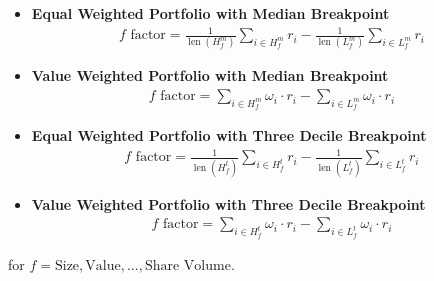 \begin{itemize}
	\item \textbf{Equal Weighted Portfolio with Median Breakpoint}
	\begin{align*}
		f \text{ factor} = \frac{1}{\operatorname{len}(H_{f}^{m})}\sum_{i \in H_{f}^{m}} r_i - \frac{1}{\operatorname{len}(L_{f}^{m})}\sum_{i \in L_{f}^{m}} r_i
	\end{align*}
	
	\item \textbf{Value Weighted Portfolio with Median Breakpoint}
	\begin{align*}
		f \text{ factor} = \sum_{i \in H_{f}^{m}} \omega_i\cdot r_i - \sum_{i \in L_{f}^{m}} \omega_i\cdot r_i
	\end{align*}
	
	\item \textbf{Equal Weighted Portfolio with Three Decile Breakpoint}
	\begin{align*}
		f \text{ factor} = \frac{1}{\operatorname{len}(H_{f}^{t})}\sum_{i \in H_{f}^{t}} r_i - \frac{1}{\operatorname{len}(L_{f}^{t})}\sum_{i \in L_{f}^{t}} r_i
	\end{align*}
	
	\item \textbf{Value Weighted Portfolio with Three Decile Breakpoint}
	\begin{align*}
		f \text{ factor} = \sum_{i \in H_{f}^{t}} \omega_i\cdot r_i - \sum_{i \in L_{f}^{t}} \omega_i\cdot r_i
	\end{align*}
\end{itemize}
for $f= \text{Size}, \text{Value}, ..., \text{Share Volume}$.




